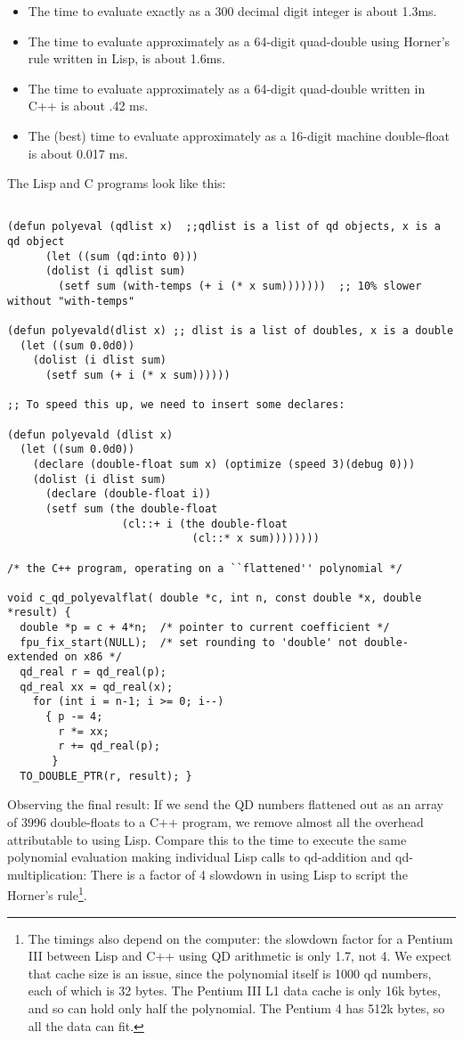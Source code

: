 \documentclass{article}
\begin{document}
\begin{itemize}
\item The time to evaluate exactly as a 300 decimal digit integer is about 1.3ms.
\item The time to evaluate approximately as a 64-digit quad-double using Horner's rule written in Lisp,
is about 1.6ms.
\item The time to evaluate approximately as a 64-digit quad-double written in C++ is about .42 ms.
\item The (best) time to evaluate approximately as a 16-digit machine double-float is about 0.017 ms.
\end{itemize}

The Lisp and C programs look like this:
\begin{verbatim}

(defun polyeval (qdlist x)  ;;qdlist is a list of qd objects, x is a qd object
      (let ((sum (qd:into 0)))
      (dolist (i qdlist sum)
        (setf sum (with-temps (+ i (* x sum)))))))  ;; 10% slower without "with-temps"

(defun polyevald(dlist x) ;; dlist is a list of doubles, x is a double
  (let ((sum 0.0d0))
    (dolist (i dlist sum)
      (setf sum (+ i (* x sum))))))

;; To speed this up, we need to insert some declares:

(defun polyevald (dlist x) 
  (let ((sum 0.0d0))
    (declare (double-float sum x) (optimize (speed 3)(debug 0)))
    (dolist (i dlist sum)      
      (declare (double-float i))
      (setf sum (the double-float 
                  (cl::+ i (the double-float 
                             (cl::* x sum))))))))

/* the C++ program, operating on a ``flattened'' polynomial */

void c_qd_polyevalflat( double *c, int n, const double *x, double *result) {
  double *p = c + 4*n;  /* pointer to current coefficient */
  fpu_fix_start(NULL);  /* set rounding to 'double' not double-extended on x86 */
  qd_real r = qd_real(p);
  qd_real xx = qd_real(x);
    for (int i = n-1; i >= 0; i--)
      { p -= 4;
        r *= xx;
        r += qd_real(p);
       }
  TO_DOUBLE_PTR(r, result); }

\end{verbatim}

Observing the final result: If we send the QD numbers flattened out as
an array of 3996 double-floats to a C++ program, we remove almost all
the overhead attributable to using Lisp.  Compare this to the time to
execute the same polynomial evaluation making individual Lisp calls to
qd-addition and qd-multiplication: There is a factor of 4 slowdown in using
Lisp to script the Horner's rule\footnote{
The timings also depend on the computer: the slowdown factor for a Pentium
III  between Lisp and C++ using QD arithmetic
is only 1.7, not 4.  We expect that cache size is an issue, since the polynomial
itself is 1000 qd numbers, each of which is 32 bytes. The Pentium III L1 data cache is
only 16k bytes, and so can hold only half the polynomial.
The Pentium 4 has 512k bytes, so all the data can fit.}.
\end{document}
